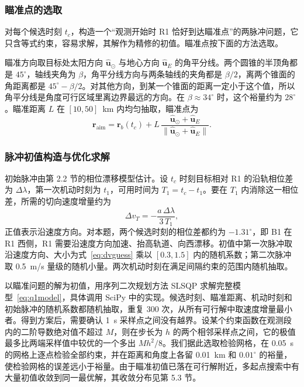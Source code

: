 \subsubsection{瞄准点的选取}

对每个候选时刻 $t_c$，构造一个“观测开始时 R1 恰好到达瞄准点”的两脉冲问题，它只含等式约束，容易求解，其解作为精修的初值。瞄准点按下面的方法选取。

瞄准方向取目标处太阳方向 $\hat{\bm u}_\odot$ 与地心方向 $\hat{\bm u}_E$ 的角平分线。两个圆锥的半顶角都是 $45^\circ$，轴线夹角为 $\beta$，角平分线方向与两条轴线的夹角都是 $\beta/2$，离两个锥面的角距离都是 $45^\circ - \beta/2$。对其他方向，到某一个锥面的距离一定小于这个值，所以角平分线是角度可行区域里离边界最远的方向。在 $\beta \approx 34^\circ$ 时，这个裕量约为 $28^\circ$。瞄准距离 $L$ 在 $[10, 50]$~km 内均匀抽取，瞄准点为
\begin{equation}
  \bm r_{\mathrm{aim}} = \bm r_b(t_c) + L\,\frac{\hat{\bm u}_\odot + \hat{\bm u}_E}{\|\hat{\bm u}_\odot + \hat{\bm u}_E\|} .
  \label{eq:aim}
\end{equation}

\subsubsection{脉冲初值构造与优化求解}

初始脉冲由第 2.2 节的相位漂移模型估计。设 $t_c$ 时刻目标相对 R1 的沿轨相位差为 $\Delta\lambda$，第一次机动时刻为 $t_1$，可用时间为 $T_1 = t_c - t_1$。要在 $T_1$ 内消除这一相位差，所需的切向速度增量约为
\begin{equation}
  \Delta v_T = -\frac{a\,\Delta\lambda}{3\,T_1},
  \label{eq:dvguess}
\end{equation}
正值表示沿速度方向。对本题，两个候选时刻的相位差都约为 $-1.31^\circ$，即 B1 在 R1 西侧，R1 需要沿速度方向加速、抬高轨道、向西漂移。初值中第一次脉冲取沿速度方向、大小为式~\eqref{eq:dvguess} 乘以 $[0.3, 1.5]$ 内的随机系数；第二次脉冲取 0.5~m/s 量级的随机小量。两次机动时刻在满足间隔约束的范围内随机抽取。

以瞄准问题的解为初值，用序列二次规划方法 SLSQP\cite{kraft1988} 求解完整模型~\eqref{eq:q1model}，具体调用 SciPy 中的实现\cite{scipy2020}。候选时刻、瞄准距离、机动时刻和初始脉冲的随机系数都随机抽取，重复 300 次，从所有可行解中取速度增量最小者。得到方案后，需要确认 1~s 采样点之间没有越界。设某个约束函数在观测段内的二阶导数绝对值不超过 $M$，则在步长为 $h$ 的两个相邻采样点之间，它的极值最多比两端采样值中较优的一个多出 $Mh^2/8$。我们据此选取检验网格，在 0.05~s 的网格上逐点检验全部约束，并在距离和角度上各留 0.01~km 和 $0.01^\circ$ 的裕量，使检验网格的误差远小于裕量。由于瞄准初值已落在可行解附近，多起点搜索中有大量初值收敛到同一最优解，其收敛分布见第 5.3 节。

